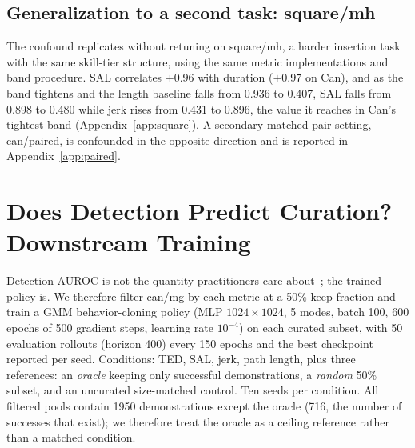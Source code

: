 \documentclass[10pt]{article}
\begin{document}
\subsection{Generalization to a second task: square/mh}
\label{sec:square}

The confound replicates without retuning on square/mh, a harder insertion
task with the same skill-tier structure, using the same metric
implementations and band procedure. SAL correlates $+0.96$ with duration
($+0.97$ on Can), and as the band tightens and the length baseline falls
from 0.936 to 0.407, SAL falls from 0.898 to 0.480 while jerk rises from
0.431 to 0.896, the value it reaches in Can's tightest band
(Appendix~\ref{app:square}). A secondary matched-pair setting, can/paired,
is confounded in the opposite direction and is reported in
Appendix~\ref{app:paired}.

\section{Does Detection Predict Curation? Downstream Training}
\label{sec:training}

Detection AUROC is not the quantity practitioners care
about~\citep{bedi-policy}; the trained policy is. We therefore filter can/mg
by each metric at a 50\% keep fraction and train a GMM behavior-cloning
policy (MLP $1024{\times}1024$, 5 modes, batch 100, 600 epochs of 500
gradient steps, learning rate $10^{-4}$) on each curated subset, with 50
evaluation rollouts (horizon 400) every 150 epochs and the best checkpoint
reported per seed. Conditions: TED, SAL, jerk, path length, plus three
references: an \emph{oracle} keeping only successful demonstrations, a
\emph{random} 50\% subset, and an uncurated size-matched control. Ten seeds
per condition. All filtered pools contain 1950 demonstrations except the
oracle (716, the number of successes that exist); we therefore treat the
oracle as a ceiling reference rather than a matched condition.
\end{document}
